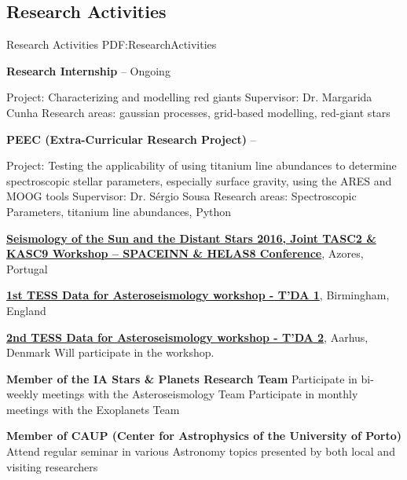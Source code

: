 \documentclass[letterpaper,10pt,oneside]{article}
\begin{document}
\begin{body}
\section
{Research Activities}
{Research Activities}
{PDF:ResearchActivities}

{\textbf{Research Internship}}
\hfill
{} -- Ongoing
\begin{detail}
\SubBulletItem
Project:
​Characterizing and modelling red giants
\SubBulletItem
Supervisor:
Dr. Margarida Cunha
\SubBulletItem
Research areas: gaussian processes, grid-based modelling, red-giant stars
\end{detail}

\BigGap
{\textbf{PEEC (Extra-Curricular Research Project)}}
\hfill
{} --
\begin{detail}
\SubBulletItem
Project:
Testing the applicability of using titanium line abundances to determine spectroscopic stellar parameters, especially surface gravity, using the ARES and MOOG tools
\SubBulletItem
Supervisor:
Dr. Sérgio Sousa
\SubBulletItem
Research areas: Spectroscopic Parameters, titanium line abundances, Python
\end{detail}

\BigGap
\href{http://www.iastro.pt/research/conferences/spacetk16/}
{\textbf{Seismology of the Sun and the Distant Stars 2016, Joint TASC2 \& KASC9 Workshop – SPACEINN \& HELAS8 Conference}},
Azores, Portugal
\hfill
{}

\BigGap
\href{http://sac.au.dk/currently/tess-data-for-asteroseismology-workshop/}
{\textbf{1st TESS Data for Asteroseismology workshop - T'DA 1}},
Birmingham, England
\hfill
{}

\BigGap
\href{http://sac.au.dk/currently/2nd-tess-data-for-asteroseismology-workshop/}
{\textbf{2nd TESS Data for Asteroseismology workshop - T'DA 2}},
Aarhus, Denmark
\hfill
{}
\GapNoBreak
\BulletItem
Will participate in the workshop.

\BigGap
\textbf{Member of the IA Stars \& Planets Research Team}
\GapNoBreak
\BulletItem
Participate in bi-weekly meetings with the Asteroseismology Team
\GapNoBreak
\BulletItem
Participate in monthly meetings with the Exoplanets Team

\BigGap
\textbf{Member of CAUP (Center for Astrophysics of the University of Porto)}
\GapNoBreak
\BulletItem
Attend regular seminar in various Astronomy topics presented by both local and visiting researchers


\end{body}
\end{document}
